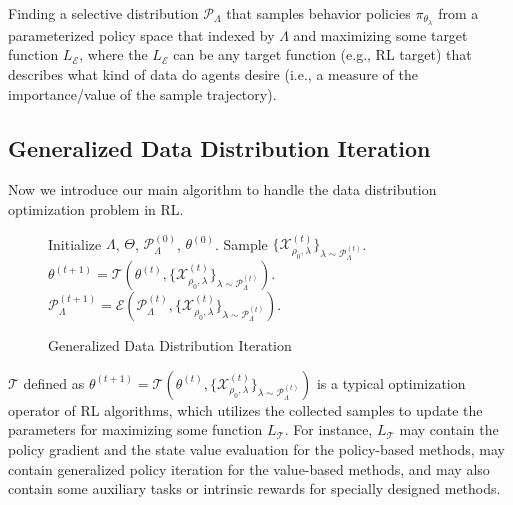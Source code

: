 \begin{definition} \label{Data Distribution Optimization Problem} Finding a selective distribution $\mathcal{P}_{\Lambda}$ that samples behavior policies $\pi_{\theta_\lambda}$ from a parameterized policy space that indexed by $\Lambda$ and maximizing some target function $L_{\mathcal{E}}$, where the $L_{\mathcal{E}}$ can be any target function (e.g., RL target) that describes what kind of data do agents desire (i.e., a measure of the importance/value of the sample trajectory).
\end{definition}

 \subsection{Generalized Data Distribution Iteration}
 \label{sec: Generalized Data Distribution Iteration}
 Now we introduce our main algorithm to handle the data distribution optimization problem in RL.

\begin{figure}[ht]
  \centering
  \begin{minipage}{\linewidth}
    \begin{algorithm}[H]
      \caption{Generalized Data Distribution Iteration}  
          \begin{algorithmic}
            \STATE Initialize $\Lambda$, $\Theta$, $\mathcal{P}_{\Lambda}^{(0)}$, $\theta^{(0)}$.
                \STATE Sample $\{\mathcal{X}^{(t)}_{\rho_0, \lambda}\}_{\lambda \sim \mathcal{P}^{(t)}_{\Lambda}}$. 
                \STATE $\theta^{(t+1)} = \mathcal{T}( \theta^{(t)}, \{\mathcal{X}^{(t)}_{\rho_0, \lambda}\}_{\lambda \sim \mathcal{P}^{(t)}_{\Lambda}} )$.  
                \STATE $\mathcal{P}_{\Lambda}^{(t+1)}  = \mathcal{E}(\mathcal{P}_{\Lambda}^{(t)}, \{\mathcal{X}^{(t)}_{\rho_0, \lambda}\}_{\lambda \sim \mathcal{P}^{(t)}_{\Lambda}} )$. 
            \ENDFOR
          \end{algorithmic}
        \label{alg:GDI}
    \end{algorithm}
  \end{minipage}
\end{figure}

$\mathcal{T}$ defined as $\theta^{(t+1)} 
= \mathcal{T}( \theta^{(t)}, \{\mathcal{X}^{(t)}_{\rho_0, \lambda}\}_{\lambda \sim \mathcal{P}^{(t)}_{\Lambda}} )$
is a typical optimization operator of RL algorithms, 
which utilizes the collected samples to update the parameters for maximizing some function $L_{\mathcal{T}}$.
For instance, $L_{\mathcal{T}}$ may contain the policy gradient and the state value evaluation for the policy-based methods, 
may contain generalized policy iteration for the value-based methods, 
and may also contain some auxiliary tasks or intrinsic rewards for specially designed methods.

